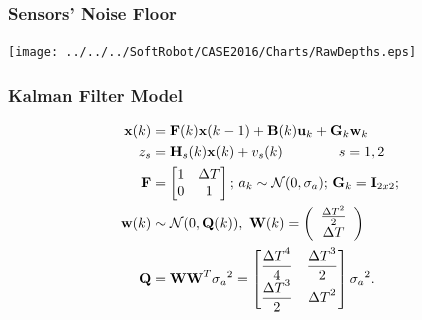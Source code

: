 \begin{frame}
\frametitle{Sensors' Noise Floor}
		\texttt{[image: ../../../SoftRobot/CASE2016/Charts/RawDepths.eps]}
\end{frame}

\begin{frame}
\frametitle{Kalman Filter Model}
		\begin{align}
				\textbf{x}(k) &= \textbf{F}(k)\textbf{x}({k-1})+\textbf{B}(k)\textbf{u}_k+\textbf{G}_k\textbf{w}_k \nonumber \\
				\vspace{0.1in}
				{z}_s &= \textbf{H}_s(k)\textbf{x}(k)+{v}_s(k) \qquad \qquad s = 1,2 \nonumber \\
				\vspace{0.1in}
				\textbf{F} &= \begin{bmatrix}
									1 & \Delta T \\
									0	& 1
								\end{bmatrix}; \,
		 a_k \sim \mc{N}(0,  \sigma_a); \, \textbf{G}_k = \textbf{I}_{2x2};  \nonumber \\
		 \textbf{w}(k) &\sim \mathcal{N}(0, \textbf{Q}(k)), \,\,
		\textbf{W}(k) = \left(\begin{array}{c}
		\frac{{\Delta T}^2}{2} \\ \Delta T
		\end{array}\right) \nonumber \\
		\vspace{0.1in}
		\textbf{Q} &= \textbf{W}\textbf{W}^T{\sigma_a}^2
		= \begin{bmatrix}
		\dfrac{{\Delta T}^4}{4} &	\dfrac{{\Delta T}^3}{2} \\
		\dfrac{{\Delta T}^3}{2} & {\Delta T}^2
		\end{bmatrix}{\sigma_a}^2.
		\end{align}
\end{frame}

